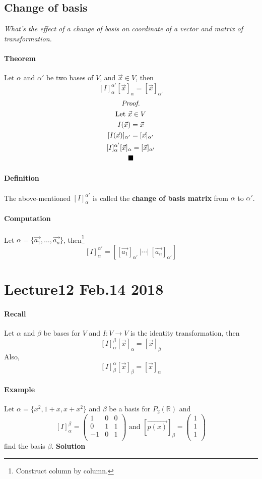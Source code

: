 \documentclass[11pt]{article}
\newcommand{\trans}[3]{{#1}: {#2} \to {#3}}
\newcommand{\R}[0]{\mathbb{R}}
\newcommand{\coor}[2]{[\vec{{#1}}]_{{#2}}}
\newcommand{\tmat}[3]{[{#1}]_{{#2}}^{{#3}}}
\newcommand{\vset}[3]{\{\vec{{#1}_{#2}}, \dots, \vec{{#1}_{#3}}\}}
\newcommand{\definition}[0]{\paragraph{Definition}}
\newcommand{\theorem}[0]{\paragraph{Theorem}}
\begin{document}
	\subsection{Change of basis}
	\emph{What's the effect of a change of basis on coordinate of a vector and matrix of transformation.}
	\theorem Let $\alpha$ and $\alpha '$ be two bases of $V$, and $\vec{x} \in V$, then
	\[
		\tmat{I}{\alpha}{\alpha '} \coor{x}{\alpha} = \coor{x}{\alpha '}
	\]
	\begin{multline*}
		\emph{Proof.} \\
		\text{Let } \vec{x} \in V \\
		I(\vec{x}) = \vec{x} \\
		[I(\vec{x})]_{\alpha '} = \coor{x}{\alpha '} \\
		\tmat{I}{\alpha}{\alpha '} \coor{x}{\alpha} = \coor{x}{\alpha '} \\
		\blacksquare
	\end{multline*}
	\definition The above-mentioned $\tmat{I}{\alpha}{\alpha '}$ is called the \textbf{change of basis matrix} from $\alpha$ to $\alpha '$.
	\paragraph{Computation} Let $\alpha = \vset{a}{1}{n}$, then\footnote{Construct column by column.}
	\[
		\tmat{I}{\alpha}{\alpha '} = [\coor{a_1}{\alpha '}\ \vert \cdots \vert \ \coor{a_n}{\alpha '}]
	\]
	
	\section{Lecture12 Feb.14 2018}
	\paragraph{Recall} Let $\alpha$ and $\beta$ be bases for $V$ and $\trans{I}{V}{V}$ is the identity transformation, then
	\[
		\tmat{I}{\alpha}{\beta}\coor{x}{\alpha} = \coor{x}{\beta}
	\]
	Also,
	\[
		\tmat{I}{\beta}{\alpha}\coor{x}{\beta} = \coor{x}{\alpha}
	\]
	\paragraph{Example} Let $\alpha = \{x^2, 1+x, x+x^2\}$ and $\beta$ be a basis for $P_2(\R)$ and
	\[
		\tmat{I}{\alpha}{\beta} = \begin{pmatrix}
			1 & 0 & 0 \\
			0 & 1 & 1 \\
			-1 & 0 & 1 \\
		\end{pmatrix} \text{ and } \coor{p(x)}{\beta} = \begin{pmatrix}
			1 \\
			1 \\
			1 \\
		\end{pmatrix}
	\]
	find the basis $\beta$.
	\newline
	\textbf{Solution} 
	
\end{document}
